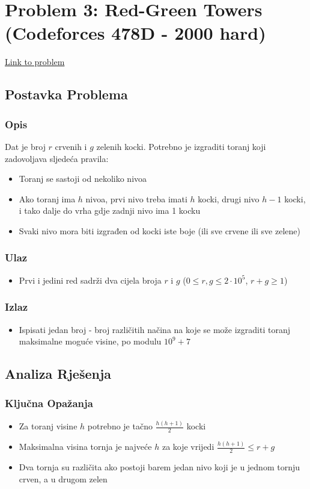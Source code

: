 \section{Problem 3: Red-Green Towers (Codeforces 478D - 2000 hard)}
\href{https://codeforces.com/problemset/problem/478/D}{Link to problem}

\subsection{Postavka Problema}
\subsubsection{Opis}
Dat je broj $r$ crvenih i $g$ zelenih kocki. Potrebno je izgraditi toranj koji zadovoljava sljedeća pravila:
\begin{itemize}
    \item Toranj se sastoji od nekoliko nivoa
    \item Ako toranj ima $h$ nivoa, prvi nivo treba imati $h$ kocki, drugi nivo $h-1$ kocki, i tako dalje do vrha gdje zadnji nivo ima 1 kocku
    \item Svaki nivo mora biti izgrađen od kocki iste boje (ili sve crvene ili sve zelene)
\end{itemize}

\subsubsection{Ulaz}
\begin{itemize}
    \item Prvi i jedini red sadrži dva cijela broja $r$ i $g$ ($0 \leq r, g \leq 2 \cdot 10^5$, $r + g \geq 1$)
\end{itemize}

\subsubsection{Izlaz}
\begin{itemize}
    \item Ispisati jedan broj - broj različitih načina na koje se može izgraditi toranj maksimalne moguće visine, po modulu $10^9 + 7$
\end{itemize}

\subsection{Analiza Rješenja}
\subsubsection{Ključna Opažanja}
\begin{itemize}
    \item Za toranj visine $h$ potrebno je tačno $\frac{h(h+1)}{2}$ kocki
    \item Maksimalna visina tornja je najveće $h$ za koje vrijedi $\frac{h(h+1)}{2} \leq r + g$
    \item Dva tornja su različita ako postoji barem jedan nivo koji je u jednom tornju crven, a u drugom zelen
\end{itemize}

